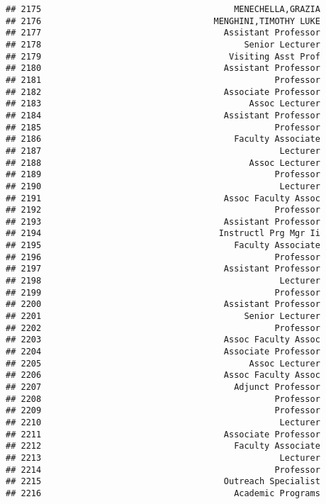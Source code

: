 \documentclass[
]{article}
\begin{document}
\begin{verbatim}
## 2175                                      MENECHELLA,GRAZIA
## 2176                                  MENGHINI,TIMOTHY LUKE
## 2177                                    Assistant Professor
## 2178                                        Senior Lecturer
## 2179                                     Visiting Asst Prof
## 2180                                    Assistant Professor
## 2181                                              Professor
## 2182                                    Associate Professor
## 2183                                         Assoc Lecturer
## 2184                                    Assistant Professor
## 2185                                              Professor
## 2186                                      Faculty Associate
## 2187                                               Lecturer
## 2188                                         Assoc Lecturer
## 2189                                              Professor
## 2190                                               Lecturer
## 2191                                    Assoc Faculty Assoc
## 2192                                              Professor
## 2193                                    Assistant Professor
## 2194                                   Instructl Prg Mgr Ii
## 2195                                      Faculty Associate
## 2196                                              Professor
## 2197                                    Assistant Professor
## 2198                                               Lecturer
## 2199                                              Professor
## 2200                                    Assistant Professor
## 2201                                        Senior Lecturer
## 2202                                              Professor
## 2203                                    Assoc Faculty Assoc
## 2204                                    Associate Professor
## 2205                                         Assoc Lecturer
## 2206                                    Assoc Faculty Assoc
## 2207                                      Adjunct Professor
## 2208                                              Professor
## 2209                                              Professor
## 2210                                               Lecturer
## 2211                                    Associate Professor
## 2212                                      Faculty Associate
## 2213                                               Lecturer
## 2214                                              Professor
## 2215                                    Outreach Specialist
## 2216                                      Academic Programs

\end{verbatim}
\end{document}
